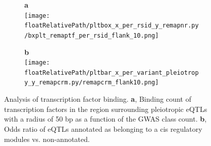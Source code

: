 
\begin{figure}[!tbp]
    \centering
%
    \begin{subfigure}[]{.33\textwidth}
        \textbf{a}
        \\
        \texttt{[image: \\floatRelativePath/pltbox\_x\_per\_rsid\_y\_remapnr.py/bxplt\_remaptf\_per\_rsid\_flank\_10.png]}
    \end{subfigure}
%
    \begin{subfigure}[]{.33\textwidth}
        \textbf{b}
        \\
        \texttt{[image: \\floatRelativePath/pltbar\_x\_per\_variant\_pleiotropy\_y\_remapcrm.py/remapcrm\_flank10.png]}
    \end{subfigure}
%
    \caption{Analysis of transcription factor binding.
    \textbf{a}, Binding count of transcription factors in the region surrounding pleiotropic eQTLs with a radius of 50 bp as a function of the GWAS class count.
    \textbf{b}, Odds ratio of eQTLs annotated as belonging to a cis regulatory modules vs. non-annotated.} \label{fig:freq_tf_per_variant}
%
\end{figure}

%
%
%

